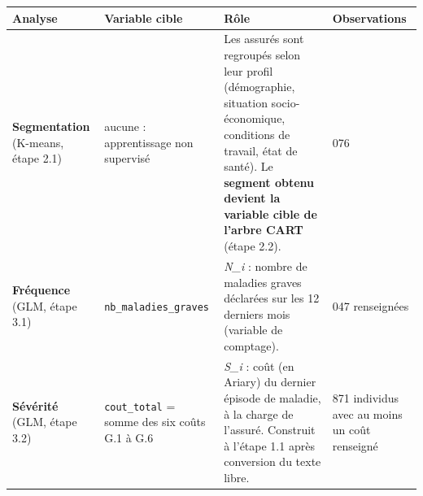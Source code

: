 \documentclass[

  french,

  10pt,

  a4paper,

]{article}
\newcounter{none} %
\begin{document}
{\def\LTcaptype{none} %

\begin{longtable}[]{@{}

  >{\raggedright\arraybackslash}p{}

  >{\raggedright\arraybackslash}p{}

  >{\raggedright\arraybackslash}p{}

  >{\raggedright\arraybackslash}p{}@{}}

\toprule\noalign{}

\begin{minipage}[b]{\linewidth}\raggedright

Analyse

\end{minipage} & \begin{minipage}[b]{\linewidth}\raggedright

Variable cible

\end{minipage} & \begin{minipage}[b]{\linewidth}\raggedright

Rôle

\end{minipage} & \begin{minipage}[b]{\linewidth}\raggedright

Observations

\end{minipage} \\

\midrule\noalign{}

\endhead

\bottomrule\noalign{}

\endlastfoot

\textbf{Segmentation} (K-means, étape 2.1) & aucune : apprentissage non supervisé & Les assurés sont regroupés selon leur profil (démographie, situation socio-économique, conditions de travail, état de santé). Le \textbf{segment obtenu devient la variable cible de l'arbre CART} (étape 2.2). & 4 076 \\

\textbf{Fréquence} (GLM, étape 3.1) & \texttt{nb\_maladies\_graves} & \emph{N\_i} : nombre de maladies graves déclarées sur les 12 derniers mois (variable de comptage). & 4 047 renseignées \\

\textbf{Sévérité} (GLM, étape 3.2) & \texttt{cout\_total} = somme des six coûts G.1 à G.6 & \emph{S\_i} : coût (en Ariary) du dernier épisode de maladie, à la charge de l'assuré. Construit à l'étape 1.1 après conversion du texte libre. & 3 871 individus avec au moins un coût renseigné \\

\end{longtable}

}
\end{document}
